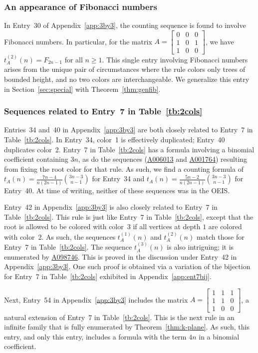 \documentclass[12pt]{amsart}
\newcommand{\seqnum}[1]{\href{https://oeis.org/#1}{#1}}
\begin{document}
\subsubsection{An appearance of Fibonacci numbers}
In Entry~30 of Appendix~\ref{app:3by3}, the counting sequence is found to involve Fibonacci numbers. In particular, for the matrix $A=\begin{bmatrix}
    0&0&0\\
    1&0&1\\
    1&0&0
\end{bmatrix}$, we have $t^{(2)}_A(n)=F_{2n-1}$ for all $n\geq1$. This single entry involving Fibonacci numbers arises from the unique pair of circumstances where the rule colors only trees of bounded height, and no two colors are interchangeable. We generalize this entry in Section~\ref{sec:special} with Theorem~\ref{thm:genfib}.

\subsubsection{Sequences related to Entry~7 in Table~\ref{tb:2cols}}
Entries~34 and~40 in Appendix~\ref{app:3by3} are both closely related to Entry~7 in Table~\ref{tb:2cols}. In Entry~34, color~1 is effectively duplicated; Entry~40 duplicates color~2. Entry~7 in Table~\ref{tb:2cols} has a formula involving a binomial coefficient containing $3n$, as do the sequences (\seqnum{A006013} and \seqnum{A001764}) resulting from fixing the root color for that rule. As such, we find a counting formula of $t_A(n)=\frac{7n-4}{n\left(2n-1\right)}\binom{3n-3}{n-1}$ for Entry~34 and $t_A(n)=\frac{5n-2}{n\left(2n-1\right)}\binom{3n-3}{n-1}$ for Entry~40. At time of writing, neither of these sequences was in the OEIS.

Entry~42 in Appendix~\ref{app:3by3} is also closely related to Entry~7 in Table~\ref{tb:2cols}. This rule is just like Entry~7 in Table~\ref{tb:2cols}, except that the root is allowed to be colored with color~3 if all vertices at depth $1$ are colored with color~2. As such, the sequences $t^{(1)}_A(n)$ and $t^{(2)}_A(n)$ match those for Entry~7 in Table~\ref{tb:2cols}. The sequence $t^{(3)}_A(n)$ is also intriguing; it is enumerated by \seqnum{A098746}. This is proved in the discussion under Entry~42 in Appendix~\ref{app:3by3}. One such proof is obtained via a variation of the bijection for Entry~7 in Table~\ref{tb:2cols} exhibited in Appendix~\ref{app:ent7bij}.

Next, Entry~54 in Appendix~\ref{app:3by3} includes the matrix $A=\begin{bmatrix}
    1&1&1\\
    1&1&0\\
    1&0&0
\end{bmatrix}$, a natural extension of Entry~7 in Table~\ref{tb:2cols}. 
This is the next rule in an infinite family that is fully enumerated by Theorem~\ref{thm:k-plane}. 
As such, this entry, and only this entry, includes a formula with the term $4n$ in a binomial coefficient.
\end{document}
